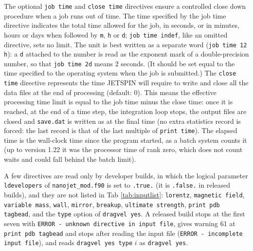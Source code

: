 The optional \texttt{job time} and \texttt{close time} directives
ensure a controlled close down procedure when a job runs out of
time. The time specified by the job time directive indicates the total
time allowed for the job, in seconds, or in minutes, hours or days when
followed by \texttt{m}, \texttt{h} or \texttt{d}; \texttt{job time indef},
like an omitted directive, sets no limit. The unit is best written as a
separate word (\texttt{job time 12 h}): a \texttt{d} attached to the
number is read as the exponent mark of a double-precision number, so that
\texttt{job time 2d} means 2 seconds. (It should be set equal to the
time specified to the operating system when the job is submitted.)
The \texttt{close time} directive represents the time JETSPIN will
require to write and close all the data files at the end of processing
(default: 0).
This means the effective processing time limit is equal to the job
time minus the close time: once it is reached, at the end of a time
step, the integration loop stops, the output files are closed and
\texttt{save.dat} is written as at the final time (no extra statistics
record is forced: the last record is that of the last multiple of
\texttt{print time}). The elapsed time is the wall-clock time since the
program started, as a batch system counts it (up to version 1.22 it was
the processor time of rank zero, which does not count waits and could
fall behind the batch limit).

A few directives are read only by developer builds, in which the logical
parameter \texttt{ldevelopers} of \texttt{nanojet\_mod.f90} is set to
\texttt{.true.} (it is \texttt{.false.} in released builds), and they are
not listed in Tab \ref{tab:inputlist}: \texttt{lorentz},
\texttt{magnetic field}, \texttt{variable mass}, \texttt{wall},
\texttt{mirror}, \texttt{breakup}, \texttt{ultimate strength},
\texttt{print pdb tagbead}, and the \texttt{type} option of
\texttt{dragvel yes}. A released build stops at the first seven with
\texttt{ERROR - unknown directive in input file}, gives warning 61 at
\texttt{print pdb tagbead} and stops after reading the input file
(\texttt{ERROR - incomplete input file}), and reads
\texttt{dragvel yes type} $i$ as \texttt{dragvel yes}.

